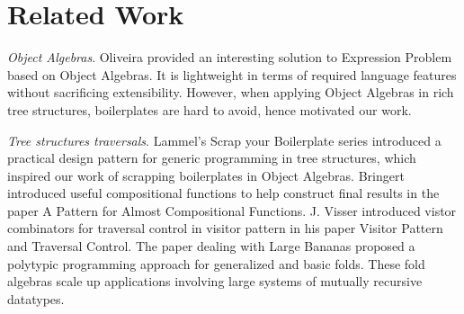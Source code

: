 \section{Related Work}\label{sec:related}

\textit{Object Algebras}. Oliveira provided an interesting solution to Expression Problem based on Object Algebras. It is lightweight in terms of required language features without sacrificing extensibility. However, when applying Object Algebras in rich tree structures, boilerplates are hard to avoid, hence motivated our work. 

\textit{Tree structures traversals}. Lammel's Scrap your Boilerplate series introduced a practical design pattern for generic programming in tree structures, which inspired our work of scrapping boilerplates in Object Algebras. Bringert introduced useful compositional functions to help construct final results in the paper A Pattern for Almost Compositional Functions. J. Visser introduced vistor combinators for traversal control in visitor pattern in his paper Visitor Pattern and Traversal Control. The paper dealing with Large Bananas proposed a polytypic programming approach for generalized and basic folds. These fold algebras scale up applications involving large systems of mutually recursive datatypes. 
